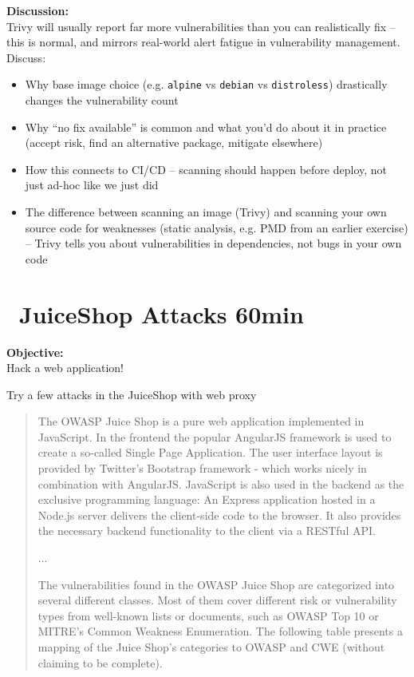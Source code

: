 \documentclass[a4paper,11pt,notitlepage]{report}
\begin{document}
{\bf Discussion:}\\
Trivy will usually report far more vulnerabilities than you can realistically fix -- this is normal, and mirrors real-world alert fatigue in vulnerability management. Discuss:
\begin{itemize}
  \item Why base image choice (e.g. \verb+alpine+ vs \verb+debian+ vs \verb+distroless+) drastically changes the vulnerability count
  \item Why ``no fix available'' is common and what you'd do about it in practice (accept risk, find an alternative package, mitigate elsewhere)
  \item How this connects to CI/CD -- scanning should happen before deploy, not just ad-hoc like we just did
  \item The difference between scanning an image (Trivy) and scanning your own source code for weaknesses (static analysis, e.g. PMD from an earlier exercise) -- Trivy tells you about vulnerabilities in dependencies, not bugs in your own code
\end{itemize}


\chapter{\faExclamationTriangle\ JuiceShop Attacks 60min}
\label{ex:juiceshop-attack}


 {\bf Objective:}\\
Hack a web application!

Try a few attacks in the JuiceShop with web proxy

\begin{quote}
The OWASP Juice Shop is a pure web application implemented in JavaScript. In the
frontend the popular AngularJS framework is used to create a so-called Single Page
Application. The user interface layout is provided by Twitter's Bootstrap framework - which
works nicely in combination with AngularJS.
JavaScript is also used in the backend as the exclusive programming language: An Express
application hosted in a Node.js server delivers the client-side code to the browser. It also
provides the necessary backend functionality to the client via a RESTful API.

...

The vulnerabilities found in the OWASP Juice Shop are categorized into several different
classes. Most of them cover different risk or vulnerability types from well-known lists or
documents, such as OWASP Top 10 or MITRE's Common Weakness Enumeration. The
following table presents a mapping of the Juice Shop's categories to OWASP and CWE
(without claiming to be complete).
\end{quote}
\end{document}
